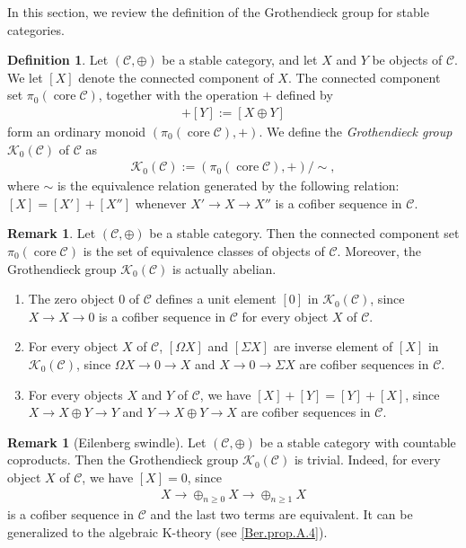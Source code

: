 \documentclass[a4paper,dvipdfmx,11pt,reqno]{amsart}
\newcommand{\C}{\mathcal{C}}
\newcommand{\K}{\mathcal{K}}
\DeclareMathOperator{\core}{core}
\theoremstyle{definition}
\newtheorem{definition}[theorem]{Definition}
\newtheorem{remark}[theorem]{Remark}
\begin{document}
In this section, we review the definition of the Grothendieck group for stable categories.

\begin{definition} \label{Ber.def.2.1}
  Let $(\C,\oplus)$ be a stable category, and let $X$ and $Y$ be objects of $\C$.
  We let $[X]$ denote the connected component of $X$.
  The connected component set $\pi_0(\core\C)$, together with the operation $+$ defined by 
  \begin{align*}
    [X] + [Y] := [X \oplus Y]
  \end{align*}
  form an ordinary monoid $(\pi_0(\core\C),+)$.
  We define the \textit{Grothendieck group} $\K_0(\C)$ of $\C$ as 
  \begin{align*}
    \K_0(\C) := (\pi_0(\core\C),+) / \sim,
  \end{align*}
  where $\sim$ is the equivalence relation generated by the following relation:
  $[X]=[X']+[X'']$ whenever $X' \to X \to X''$ is a cofiber sequence in $\C$.
\end{definition}

\begin{remark} \label{Ber.rem.2.2}
  Let $(\C,\oplus)$ be a stable category.
  Then the connected component set $\pi_0(\core\C)$ is the set of equivalence classes of objects of $\C$.
  Moreover, the Grothendieck group $\K_0(\C)$ is actually abelian.
  \begin{enumerate}
    \item The zero object $0$ of $\C$ defines a unit element $[0]$ in $\K_0(\C)$, since $X \to X \to 0$ is a cofiber sequence in $\C$ for every object $X$ of $\C$.
    \item For every object $X$ of $\C$, $[\Omega X]$ and $[\Sigma X]$ are inverse element of $[X]$ in $\K_0(\C)$, since $\Omega X \to 0 \to X$ and $X \to 0 \to \Sigma X$ are cofiber sequences in $\C$.
    \item For every objects $X$ and $Y$ of $\C$, we have $[X]+[Y]=[Y]+[X]$, since $X \to X \oplus Y \to Y$ and $Y \to X \oplus Y \to X$ are cofiber sequences in $\C$.
  \end{enumerate}
\end{remark}

\begin{remark}[Eilenberg swindle]
  Let $(\C,\oplus)$ be a stable category with countable coproducts.
  Then the Grothendieck group $\K_0(\C)$ is trivial.
  Indeed, for every object $X$ of $\C$, we have $[X] = 0$, since
  \begin{align*}
    X \to \oplus_{n \geq 0} X \to \oplus_{n \geq 1} X
  \end{align*}
  is a cofiber sequence in $\C$ and the last two terms are equivalent.
  It can be generalized to the algebraic K-theory (see \cref{Ber.prop.A.4}).
\end{remark}
\end{document}
